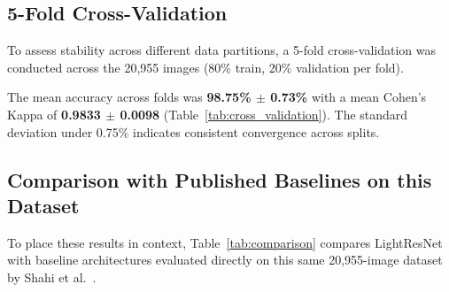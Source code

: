 \documentclass[conference]{IEEEtran}
\begin{document}
\subsection{5-Fold Cross-Validation}
To assess stability across different data partitions, a 5-fold cross-validation was conducted across the 20,955 images (80\% train, 20\% validation per fold).

\begin{table}[htbp]
\caption{5-Fold Cross-Validation Performance of LightResNet}
\label{tab:cross_validation}
\centering
{}
\end{table}

The mean accuracy across folds was \textbf{98.75\% $\pm$ 0.73\%} with a mean Cohen's Kappa of \textbf{0.9833 $\pm$ 0.0098} (Table~\ref{tab:cross_validation}). The standard deviation under 0.75\% indicates consistent convergence across splits.

\subsection{Comparison with Published Baselines on this Dataset}
To place these results in context, Table~\ref{tab:comparison} compares LightResNet with baseline architectures evaluated directly on this same 20,955-image dataset by Shahi et al.~\cite{shahi2025deep}.
\end{document}
